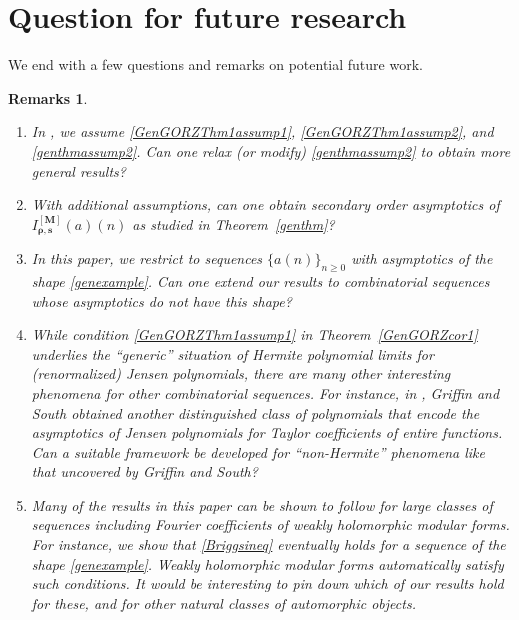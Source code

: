 \documentclass[11pt,reqno,a4paper]{amsart}
\renewcommand{\(}{\left\(}
\renewcommand{\)}{\right\)}
\numberwithin{equation}{section}
\theoremstyle{plain}
\newtheorem*{remarks}{Remarks}
\theoremstyle{definition} %
\numberwithin{equation}{section}
\begin{document}
\section{Question for future research}\label{concluding}
We end with a few questions and remarks on potential future work.  
\begin{remarks}
\leavevmode\par
\begin{enumerate}[leftmargin=*, labelsep=0.5em]
 \item \noindent  In , we assume {\rm{\ref{GenGORZThm1assump1}}}, {\rm{\ref{GenGORZThm1assump2}}}, and {\rm{\ref{genthmassump2}}}. Can one relax (or modify) {\rm{\ref{genthmassump2}}} to obtain more general results?
\item With additional assumptions, can one obtain secondary order asymptotics of $I^{[\bm{M}]}_{\bm{\rho},\bm{s}}(a)(n)$ as studied in Theorem~\ref{genthm}?
\item In this paper, we restrict to sequences $\{a(n)\}_{n \ge 0}$ with asymptotics of the shape \eqref{genexample}. Can one extend our results to combinatorial sequences whose asymptotics do not have this shape?
\item While condition {\rm{\ref{GenGORZThm1assump1}}} in Theorem~\ref{GenGORZcor1} underlies the ``generic'' situation of Hermite polynomial limits for (renormalized) Jensen polynomials, there are many other interesting phenomena for other combinatorial sequences. 
For instance, in \cite{GriffinSouth}, Griffin and South obtained another distinguished class of polynomials that encode the asymptotics of Jensen polynomials for Taylor coefficients of entire functions. Can a suitable framework be developed for ``non-Hermite'' phenomena like that uncovered by Griffin and South? 
\item 
Many of the results in this paper can be shown to follow for large classes of sequences including Fourier coefficients of weakly holomorphic modular forms. For instance, we show that \eqref{Briggsineq} eventually  holds 
for a sequence  of the shape  \eqref{genexample}. Weakly holomorphic modular forms automatically satisfy such conditions. It would be interesting to pin down which of our results hold for these, and for other natural classes of automorphic objects. 
\end{enumerate}
\end{remarks}
\end{document}
